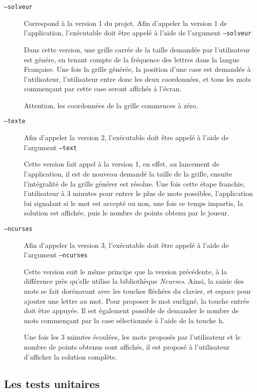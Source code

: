 \documentclass[12pt,a4paper,openany]{article}
\begin{document}
			\begin{description}
				\item[\texttt{--solveur}] Correspond à la version 1 du projet.
Afin d'appeler la version 1 de l'application, l'exécutable doit être appelé à l'aide de
l'argument \texttt{--solveur}

Dans cette version, une grille carrée de la taille demandée par l'utilisateur est génére, en
tenant compte de la fréquence des lettres dans la langue Française. Une fois la grille
générée, la position d'une case est demandée à l'utilisateur, l'utilisateur entre donc les
deux coordonnées, et tous les mots commençant par cette case seront affichés à l'écran.

Attention, les coordonnées de la grille commences à zéro.
				\item[\texttt{--texte}]
					Afin d'appeler la version 2, l'exécutable doit être appelé à l'aide de
					l'argument \texttt{--text}

					Cette version fait appel à la version 1, en effet, au lancement de
					l'application, il est de nouveau demandé la taille de la grille, ensuite
					l'intégralité de la grille générer est résolue. Une fois cette étape
					franchie, l'utilisateur à 3 minutes pour entrer le plus de mots possibles,
					l'application lui signalant si le mot est accepté ou non, une fois ce
					temps impartis, la solution est affichée, puis le nombre de points obtenu
					par le joueur.
				\item[\texttt{--ncurses}]
					Afin d'appeler la version 3, l'exécutable doit être appelé à l'aide de
					l'argument \texttt{--ncurses}

					Cette version suit le même principe que la version précédente, à la
					différence près qu'elle utilise la bibliothèque \textit{Ncurses}. Ainsi, la saisie
					des mots se fait dorénavant avec les touches fléchées du clavier, et
					espace pour ajouter une lettre au mot. Pour proposer le mot surligné, la
					touche entrée doit être appuyée. Il est également possible de demander le
					nombre de mots commençant par la case sélectionnée à l'aide de la touche
					h.

					Une fois les 3 minutes écoulées, les mots proposés par l'utilisateur et le
					nombre de points obtenus sont affichés, il est proposé à l'utilisateur
					d'afficher la solution complète. 
			\end{description}
		\subsection{Les tests unitaires}
\end{document}
